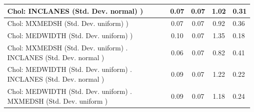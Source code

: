 \begin{table}
\begin{center}
\begin{tabular}{|l|l|c|c|c|l|}
			 Chol: INCLANES (Std. Dev. normal) ) &  & 0.07 & 0.07 & 1.02 & 0.31 \\
			\hline
			 Chol: MXMEDSH (Std. Dev. uniform) ) &  & 0.07 & 0.07 & 0.92 & 0.36 \\
			\hline
			 Chol: MEDWIDTH (Std. Dev. uniform) ) &  & 0.10 & 0.07 & 1.35 & 0.18 \\
			\hline
			 Chol: MXMEDSH (Std. Dev. uniform) . INCLANES (Std. Dev.   normal ) &  & 0.06 & 0.07 & 0.82 & 0.41 \\
			\hline
			 Chol: MEDWIDTH (Std. Dev. uniform) . INCLANES (Std. Dev.   normal ) &  & 0.09 & 0.07 & 1.22 & 0.22 \\
			\hline
			 Chol: MEDWIDTH (Std. Dev. uniform) . MXMEDSH (Std. Dev.   uniform ) &  & 0.09 & 0.07 & 1.18 & 0.24 \\
			\hline
		\end{tabular}
	\end{center}
\end{table}